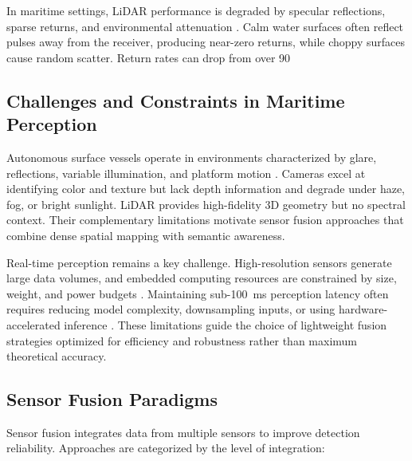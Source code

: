 In maritime settings, LiDAR performance is degraded by specular reflections, sparse returns, and environmental attenuation \cite{halterman2015, yeong2021}. Calm water surfaces often reflect pulses away from the receiver, producing near-zero returns, while choppy surfaces cause random scatter. Return rates can drop from over 90%

\subsection{Challenges and Constraints in Maritime Perception}
Autonomous surface vessels operate in environments characterized by glare, reflections, variable illumination, and platform motion \cite{bai2022, yeong2021}. Cameras excel at identifying color and texture but lack depth information and degrade under haze, fog, or bright sunlight. LiDAR provides high-fidelity 3D geometry but no spectral context. Their complementary limitations motivate sensor fusion approaches that combine dense spatial mapping with semantic awareness.

Real-time perception remains a key challenge. High-resolution sensors generate large data volumes, and embedded computing resources are constrained by size, weight, and power budgets \cite{huang, li2022deepfusion}. Maintaining sub-100~ms perception latency often requires reducing model complexity, downsampling inputs, or using hardware-accelerated inference \cite{liang2022}. These limitations guide the choice of lightweight fusion strategies optimized for efficiency and robustness rather than maximum theoretical accuracy.

\subsection{Sensor Fusion Paradigms}
Sensor fusion integrates data from multiple sensors to improve detection reliability. Approaches are categorized by the level of integration:

